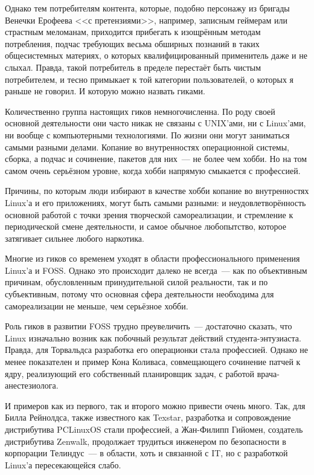 Однако тем потребителям контента, которые, подобно персонажу из бригады Венечки Ерофеева <<с претензиями>>, например, записным геймерам или страстным меломанам, приходится прибегать к изощрённым методам потребления, подчас требующих весьма обширных познаний в таких общесистемных материях, о которых квалифицированный применитель даже и не слыхал. Правда, такой потребитель в пределе перестаёт быть чистым потребителем, и тесно примыкает к той категории пользователей, о которых я раньше не говорил. И которую можно назвать гиками.

Количественно группа настоящих гиков немногочисленна. По роду своей основной деятельности они часто никак не связаны с UNIX'ами, ни с Linux'ами, ни вообще с компьютерными технологиями. По жизни они могут заниматься самыми разными делами. Копание во внутренностях операционной системы, сборка, а подчас и сочинение, пакетов для них~--- не более чем хобби. Но на том самом очень серьёзном уровне, когда хобби напрямую смыкается с профессией.

Причины, по которым люди избирают в качестве хобби копание во внутренностях Linux'а и его приложениях, могут быть самыми разными: и неудовлетворённость основной работой с точки зрения творческой самореализации, и стремление к периодической смене деятельности, и самое обычное любопытство, которое затягивает сильнее любого наркотика.

Многие из гиков со временем уходят в области профессионального применения Linux'а и FOSS. Однако это происходит далеко не всегда~--- как по объективным причинам, обусловленным принудительной силой реальности, так и по субъективным, потому что основная сфера деятельности необходима для самореализации не меньше, чем серьёзное хобби.

Роль гиков в развитии FOSS трудно преувеличить~--- достаточно сказать, что Linux изначально возник как побочный результат действий студента-энтузиаста. Правда, для Торвальдса разработка его операционки стала профессией. Однако не менее показателен и пример Кона Коливаса, совмещающего сочинение патчей к ядру, реализующий его собственный планировщик задач, с работой врача-анестезиолога.

И примеров как из первого, так и второго можно привести очень много. Так, для Билла Рейнолдса, также известного как Texstar, разработка и сопровождение дистрибутива PCLinuxOS стали профессией, а Жан-Филипп Гийомен, создатель дистрибутива Zenwalk, продолжает трудиться инженером по безопасности в корпорации Телиндус~--- в области, хоть и связанной с IT, но с разработкой Linux'а пересекающейся слабо.

